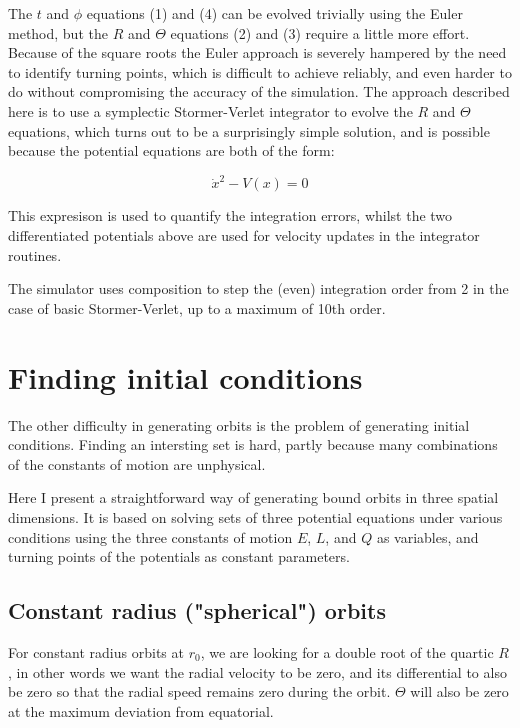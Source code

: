 \documentclass[11pt]{article}
\begin{document}
The $t$ and $\phi$ equations (1) and (4) can be evolved trivially using the Euler method, but the $R$ and $\Theta$ equations (2) and (3) require a little more effort.  Because of the square roots the Euler approach is severely hampered by the need to identify turning points, which is difficult to achieve reliably, and even harder to do without compromising the accuracy of the simulation.  The approach described here is to use a symplectic Stormer-Verlet integrator \cite{hairer} to evolve the $R$ and $\Theta$ equations, which turns out to be a surprisingly simple solution, and is possible because the potential equations are both of the form:

\begin{equation}
\dot x^2 - V(x) = 0
\end{equation}

This expresison is used to quantify the integration errors, whilst the two differentiated potentials above are used for velocity updates in the integrator routines.

The simulator uses composition to step the (even) integration order from 2 in the case of basic Stormer-Verlet, up to a maximum of 10th order.

\section{Finding initial conditions}

The other difficulty in generating orbits is the problem of generating initial conditions.  Finding an intersting set is hard, partly because many combinations of the constants of motion are unphysical.

Here I present a straightforward way of generating bound orbits in three spatial dimensions.  It is based on solving sets of three potential equations under various conditions using the three constants of motion $E$, $L$, and $Q$ as variables, and turning points of the potentials as constant parameters.

\subsection{Constant radius ("spherical") orbits}

For constant radius orbits at $r_0$, we are looking for a double root of the quartic $R$, in other words we want the radial velocity to be zero, and its differential to also be zero so that the radial speed remains zero during the orbit.  $\Theta$ will also be zero at the maximum deviation from equatorial.
\end{document}
